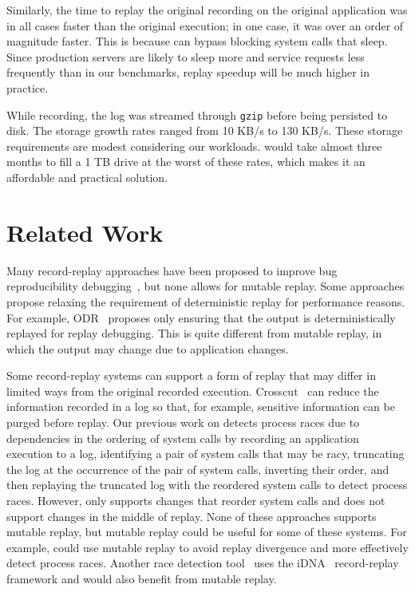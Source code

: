 Similarly, the time to replay the original recording on the original application
was in all cases faster than the original execution; in one case, it was over an
order of magnitude faster.
This is because {\dora} can bypass blocking system calls that sleep.
Since production servers are likely to sleep more and
service requests less frequently than in our benchmarks, replay
speedup will be much higher in practice.

While recording, the log was streamed through {\tt gzip} before being persisted to
disk. The storage growth rates ranged from 10 KB/s to 130 KB/s. These
storage requirements are modest considering our workloads. {\dora}
would take almost three months to fill a 1 TB drive at the worst
of these rates, which makes it an affordable and practical solution.

\section{Related Work}
\label{dora:sec:related}

Many record-replay approaches have been proposed to improve bug 
reproducibility
debugging~\cite{idna:vee06,decouple:usenix08,instant-replay,r2:osdi,odr:sosp09,pinsel:pldi07,pres:sosp09,jockey,srinivasan:flashback,subhraveti:sigmetrics11},
but none allows for mutable replay. Some
approaches
propose relaxing the requirement of deterministic replay for performance
reasons. For example, ODR~\cite{odr:sosp09} proposes only ensuring that the
output is deterministically replayed for replay debugging. This is
quite different from mutable replay, in which the output may
change due to application changes.

Some record-replay systems can support a form of replay
that may differ in limited ways from the original recorded
execution. Crosscut~\cite{crosscut} can reduce the information
recorded in a log
so that, for example, sensitive information can be
purged before
replay.
Our previous work on \racepro detects process races due to
dependencies in the ordering of system calls by recording an
application execution to a log, identifying a pair of system calls
that may be racy, truncating the log at the occurrence of the pair of
system calls, inverting their order, and then replaying the truncated
log with the reordered system calls to detect process
races.  However, \racepro only supports changes that reorder system calls and
does not support changes in the middle of replay.
None of these approaches supports mutable replay,
but mutable replay could be useful for some of these systems.  For
example, \racepro could use mutable replay to avoid replay
divergence and more effectively detect process races.  Another race
detection tool~\cite{pinsel:pldi07} uses the iDNA~\cite{idna:vee06}
record-replay framework and would also benefit from mutable replay.

